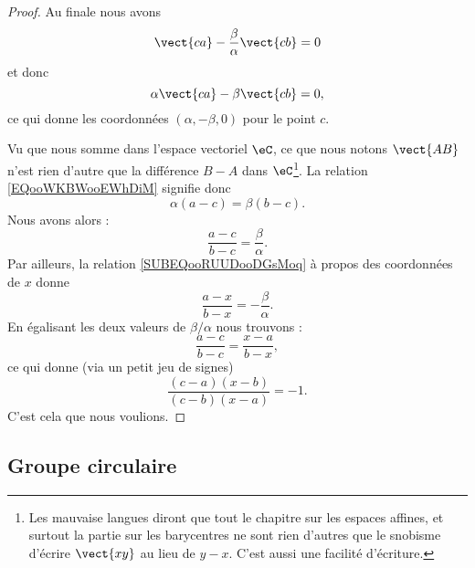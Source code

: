 \begin{proof}
    Au finale nous avons
    \begin{equation}
        \vect{ ca }-\frac{ \beta }{ \alpha }\vect{ cb }=0
    \end{equation}
    et donc
    \begin{equation}        \label{EQooWKBWooEWhDiM}
        \alpha\vect{ ca }-\beta\vect{ cb }=0,
    \end{equation}
    ce qui donne les coordonnées \( (\alpha,-\beta,0)\) pour le point \( c\).

    Vu que nous somme dans l'espace vectoriel \( \eC\), ce que nous notons \( \vect{ AB }\) n'est rien d'autre que la différence \( B-A\) dans \( \eC\)\footnote{Les mauvaise langues diront que tout le chapitre sur les espaces affines, et surtout la partie sur les barycentres ne sont rien d'autres que le snobisme d'écrire \( \vect{ xy }\) au lieu de \( y-x\). C'est aussi une facilité d'écriture.}. La relation \eqref{EQooWKBWooEWhDiM} signifie donc
    \begin{equation}
        \alpha(a-c)=\beta(b-c).
    \end{equation}
    Nous avons alors :
    \begin{equation}
        \frac{ a-c }{ b-c }=\frac{ \beta }{ \alpha }.
    \end{equation}
    Par ailleurs, la relation \eqref{SUBEQooRUUDooDGsMoq} à propos des coordonnées de \( x\) donne 
    \begin{equation}
        \frac{ a-x }{ b-x }=-\frac{ \beta }{ \alpha }.
    \end{equation}
    En égalisant les deux valeurs de \( \beta/\alpha\) nous trouvons :
    \begin{equation}
        \frac{ a-c }{ b-c }=\frac{ x-a }{ b-x },
    \end{equation}
    ce qui donne (via un petit jeu de signes)
    \begin{equation}
        \frac{ (c-a)(x-b) }{ (c-b)(x-a) }=-1.
    \end{equation}
    C'est cela que nous voulions.
\end{proof}

\subsection{Groupe circulaire}

